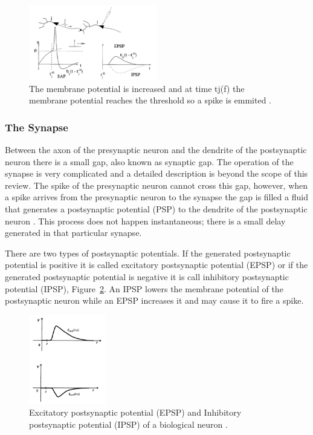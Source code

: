 \begin{figure}[h!]
  \centering
    \centering
      \includegraphics[width=0.5\textwidth]{chapter2/sap.png}
  	\caption{The membrane potential is increased and at time tj(f) the membrane potential reaches the threshold so a spike is emmited \cite{pnn}.}
	\label{sap}
\end{figure}
 
 \subsubsection{The Synapse}

Between the axon of the presynaptic neuron and the dendrite of the postsynaptic neuron there is a small gap, also known as synaptic gap. The operation of the synapse is very complicated and a detailed description is beyond the scope of this review.
 The spike of the presynaptic neuron cannot cross this gap, however, when a spike arrives from the presynaptic neuron to the synapse the gap is filled a fluid that generates a postsynaptic potential (PSP) to the dendrite of the postsynaptic neuron \cite{princNeuron}. This process does not happen instantaneous; there is a small delay generated in that particular synapse.
 
There are two types of postsynaptic potentials. If the generated postsynaptic potential is positive it is called excitatory postsynaptic potential (EPSP) or if the generated postsynaptic potential is negative it is call inhibitory postsynaptic potential (IPSP), Figure~\ref{psp}. An IPSP lowers the membrane potential of the postsynaptic neuron while an EPSP increases it and may cause it to fire a spike.  

\begin{figure}[h!]
	\centering
	\centering
	\includegraphics[width=0.3\textwidth]{chapter2/psp.png}
		\caption{Excitatory postsynaptic potential (EPSP) and Inhibitory 
			postsynaptic potential (IPSP) of a biological neuron \cite{Maass97networksof}.}
		\label{psp}
\end{figure}

